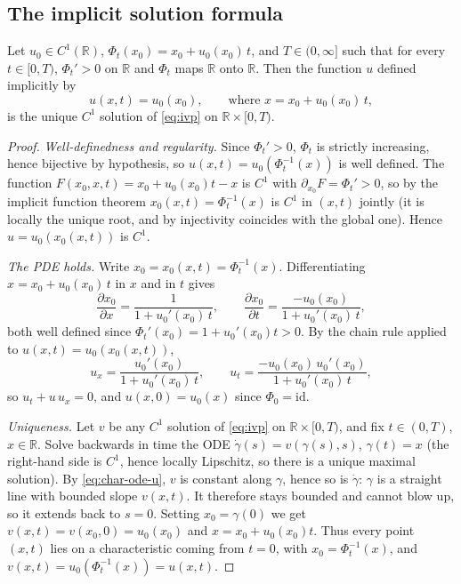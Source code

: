 \subsection{The implicit solution formula}
\label{subsec:char-implicit-formula}

\begin{theorem}
\label{thm:implicit-solution}
Let $u_0 \in C^1(\mathbb{R})$, $\Phi_t(x_0) = x_0 + u_0(x_0)\, t$, and
$T\in(0,\infty]$ such that for every $t\in[0,T)$, $\Phi_t'>0$ on $\mathbb{R}$
and $\Phi_t$ maps $\mathbb{R}$ onto $\mathbb{R}$. Then the function $u$ defined
implicitly by
\begin{equation}
  \label{eq:implicit-solution}
  u(x,t) = u_0(x_0), \qquad \text{where } x = x_0 + u_0(x_0)\, t,
\end{equation}
is the unique $C^1$ solution of \eqref{eq:ivp} on $\mathbb{R}\times[0,T)$.
\end{theorem}

\begin{proof}
\emph{Well-definedness and regularity.} Since $\Phi_t'>0$, $\Phi_t$ is
strictly increasing, hence bijective by hypothesis, so $u(x,t) =
u_0(\Phi_t^{-1}(x))$ is well defined. The function
$F(x_0,x,t)=x_0+u_0(x_0)t-x$ is $C^1$ with $\partial_{x_0}F=\Phi_t'>0$, so by
the implicit function theorem $x_0(x,t)=\Phi_t^{-1}(x)$ is $C^1$ in $(x,t)$
jointly (it is locally the unique root, and by injectivity coincides with the
global one). Hence $u=u_0(x_0(x,t))$ is $C^1$.

\emph{The PDE holds.} Write $x_0 = x_0(x,t) = \Phi_t^{-1}(x)$.
Differentiating $x = x_0 + u_0(x_0)\, t$ in $x$ and in $t$ gives
\begin{equation}
  \frac{\partial x_0}{\partial x} = \frac{1}{1 + u_0'(x_0)\,t},
  \qquad
  \frac{\partial x_0}{\partial t} = \frac{-u_0(x_0)}{1 + u_0'(x_0)\, t},
\end{equation}
both well defined since $\Phi_t'(x_0) = 1+u_0'(x_0)t > 0$. By the chain
rule applied to $u(x,t) = u_0(x_0(x,t))$,
\begin{equation}
  u_x = \frac{u_0'(x_0)}{1 + u_0'(x_0)\,t},
  \qquad
  u_t = \frac{-u_0(x_0)\, u_0'(x_0)}{1 + u_0'(x_0)\, t},
\end{equation}
so $u_t + u\,u_x = 0$, and $u(x,0)=u_0(x)$ since $\Phi_0=\mathrm{id}$.

\emph{Uniqueness.} Let $v$ be any $C^1$ solution of \eqref{eq:ivp} on
$\mathbb{R}\times[0,T)$, and fix $t\in(0,T)$, $x\in\mathbb{R}$. Solve backwards in time
the ODE $\dot\gamma(s)=v(\gamma(s),s)$, $\gamma(t)=x$ (the right-hand side is $C^1$,
hence locally Lipschitz, so there is a unique maximal solution). By
\eqref{eq:char-ode-u}, $v$ is constant along $\gamma$, hence so is $\dot\gamma$:
$\gamma$ is a straight line with bounded slope $v(x,t)$. It therefore stays
bounded and cannot blow up, so it extends back to $s=0$. Setting
$x_0=\gamma(0)$ we get $v(x,t)=v(x_0,0)=u_0(x_0)$ and $x=x_0+u_0(x_0)t$.
Thus every point $(x,t)$ lies on a characteristic coming from $t=0$, with
$x_0=\Phi_t^{-1}(x)$, and $v(x,t)=u_0(\Phi_t^{-1}(x))=u(x,t)$.
\end{proof}

